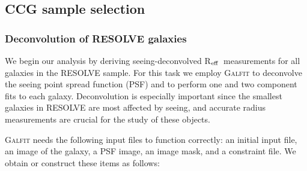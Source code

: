 \documentclass[iop,apj]{emulateapj}
\newcommand{\Reff}{R$_{\rm eff}$}
\begin{document}
\subsection{CCG sample selection}

\subsubsection{Deconvolution of RESOLVE galaxies}
\label{deconv}

  We begin our analysis by deriving seeing-deconvolved \Reff\ measurements for all galaxies in the RESOLVE sample. For this task we employ \textsc{Galfit} \citep{Peng2002} to deconvolve the seeing point spread function (PSF) and to perform one and two component fits to each galaxy. Deconvolution is especially important since the smallest galaxies in RESOLVE are most affected by seeing, and accurate radius measurements are crucial for the study of these objects. 

\textsc{Galfit} needs the following input files to function correctly: an initial input file, an image of the galaxy, a PSF image, an image mask, and a constraint file. We obtain or construct these items as follows:
\end{document}
